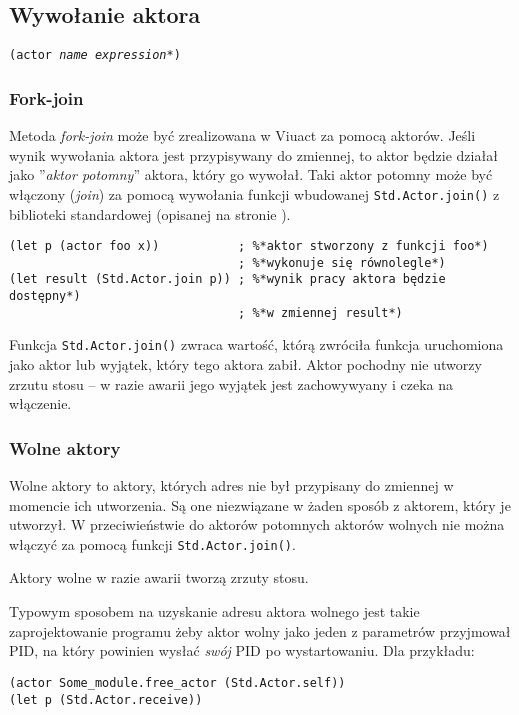 \subsection{Wywołanie aktora}

\texttt{(actor \emph{name} \emph{expression}*)}

\subsubsection{Fork-join}

Metoda \emph{fork-join} może być zrealizowana w Viuact za pomocą aktorów. Jeśli wynik wywołania aktora jest
przypisywany do zmiennej, to aktor będzie działał jako ''\emph{aktor potomny}'' aktora, który go wywołał. Taki
aktor potomny może być włączony (\emph{join}) za pomocą wywołania funkcji wbudowanej \texttt{Std.Actor.join()}
z biblioteki standardowej (opisanej na stronie \pageref{Std_Actor_join}).

\begin{lstlisting}
(let p (actor foo x))           ; %*aktor stworzony z funkcji foo*)
                                ; %*wykonuje się równolegle*)
(let result (Std.Actor.join p)) ; %*wynik pracy aktora będzie dostępny*)
                                ; %*w zmiennej result*)
\end{lstlisting}

Funkcja \texttt{Std.Actor.join()} zwraca wartość, którą zwróciła funkcja uruchomiona jako aktor lub wyjątek,
który tego aktora zabił. Aktor pochodny nie utworzy zrzutu stosu -- w razie awarii jego wyjątek jest
zachowywyany i czeka na włączenie.

\subsubsection{Wolne aktory}

Wolne aktory to aktory, których adres nie był przypisany do zmiennej w momencie ich utworzenia. Są one
niezwiązane w żaden sposób z aktorem, który je utworzył. W przeciwieństwie do aktorów potomnych aktorów
wolnych nie można włączyć za pomocą funkcji \texttt{Std.Actor.join()}.

Aktory wolne w razie awarii tworzą zrzuty stosu.

Typowym sposobem na uzyskanie adresu aktora wolnego jest takie zaprojektowanie programu żeby aktor wolny jako
jeden z parametrów przyjmował PID, na który powinien wysłać \emph{swój} PID po wystartowaniu. Dla przykładu:

\begin{lstlisting}
(actor Some_module.free_actor (Std.Actor.self))
(let p (Std.Actor.receive))
\end{lstlisting}

